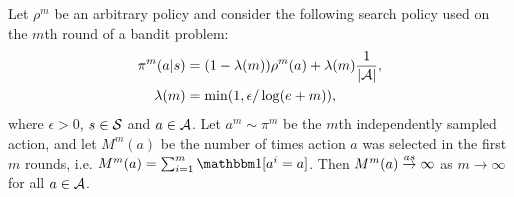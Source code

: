     \begin{lemma} 
        \label{lem:inf_often_action_select}
        Let $\rho^m$ be an arbitrary policy and consider the following search policy used on the $m$th round of a bandit problem:
        \begin{align} 
            \pi^m(a|s)&=(1-\lambda(m))\rho^m(a) + \lambda(m) \frac{1}{|\mathcal{A}|}, \label{eq:4:ioas_policy} \\
            \lambda(m) &= \min(1,\epsilon/\log(e+m)),
        \end{align}
        where $\epsilon > 0$, $s\in\mathcal{S}$ and $a\in\mathcal{A}$. Let $a^m\sim \pi^m$ be the $m$th independently sampled action, and let $M^m(a)$ be the number of times action $a$ was selected in the first $m$ rounds, i.e. $M^m(a)=\sum_{i=1}^m \one[a^i=a]$. Then $M^m(a)\overset{as}{\to}\infty$ as $m\rightarrow \infty$ for all $a\in\mathcal{A}$. 
    \end{lemma}
